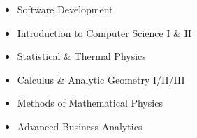 \documentclass[11pt,a4paper]{article}
\begin{document}
\begin{multicols}{2}
\begin{itemize}[noitemsep] %
    \item Software Development
    \item Introduction to Computer Science I \& II
    \item Statistical \& Thermal Physics
    \item Calculus \& Analytic Geometry I/II/III
    \item Methods of Mathematical Physics
    \item Advanced Business Analytics
\end{itemize}

\end{multicols}
\end{document}

